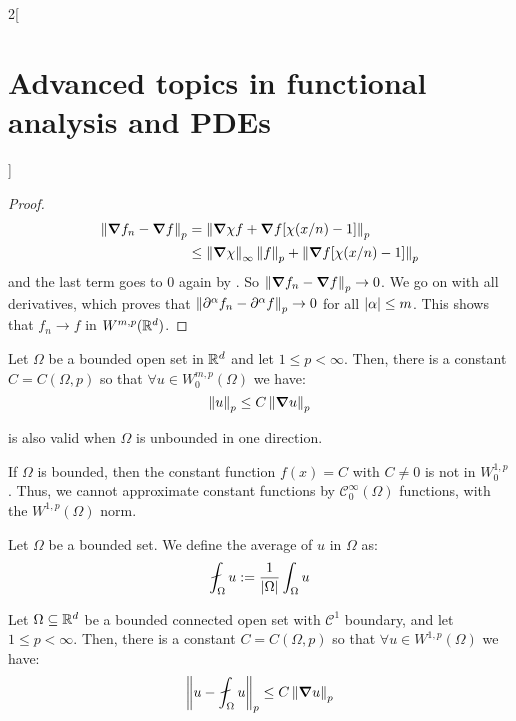 \documentclass[../../../main_math.tex]{subfiles}
\begin{document}
\begin{multicols}{2}[\section{Advanced topics in functional analysis and PDEs}]
\begin{proof}
    \begin{align*}
      \left\|\grad f_n-\grad f\right\|_p & =\left\|\grad\chi f+\grad f[\chi(x/n)-1]\right\|_p                           \\
                                 & \leq \left\|\grad\chi\right\|_\infty\left\|f\right\|_p+\left\|\grad f[\chi(x/n)-1]\right\|_p
    \end{align*}
    and the last term goes to 0 again by . So $\left\|\grad f_n-\grad f\right\|_p\to 0$. We go on with all derivatives, which proves that $\left\|\partial^\alpha f_n-\partial^\alpha f\right\|_p\to 0$ for all $\abs{\alpha}\leq m$. This shows that $f_n\to f$ in $W^{m,p}(\mathbb{R}^d)$.
  \end{proof}
  \begin{theorem}\label{ATFAPDE:poincare_ineq}
    Let $\Omega$ be a bounded open set in $\mathbb{R}^d$ and let $1\leq p<\infty$. Then, there is a constant $C=C(\Omega,p)$ so that $\forall u\in W_0^{m,p}(\Omega)$ we have:
    $$
      \left\|u\right\|_p\leq C\left\|\grad u\right\|_p
    $$
  \end{theorem}
  \begin{remark}
     is also valid when $\Omega$ is unbounded in one direction.
  \end{remark}
  \begin{corollary}
    If $\Omega$ is bounded, then the constant function $f(x)=C$ with $C\ne 0$ is not in $W_0^{1,p}$. Thus, we cannot approximate constant functions by $\mathcal{C}_0^\infty(\Omega)$ functions, with the $W^{1,p}(\Omega)$ norm.
  \end{corollary}
  \begin{definition}
    Let $\Omega$ be a bounded set. We define the average of $u$ in $\Omega$ as:
    $$
      \fint_\Omega u:=\frac{1}{\abs{\Omega}}\int_\Omega u
    $$
  \end{definition}
  \begin{theorem}
    Let $\Omega\subseteq \mathbb{R}^d$ be a bounded connected open set with $\mathcal{C}^1$ boundary, and let $1\leq p<\infty$. Then, there is a constant $C=C(\Omega,p)$ so that $\forall u\in W^{1,p}(\Omega)$ we have:
    $$
      \norm{u-\fint_\Omega u}_p\leq C\norm{\grad u}_p
    $$
  \end{theorem}
\end{multicols}
\end{document}
